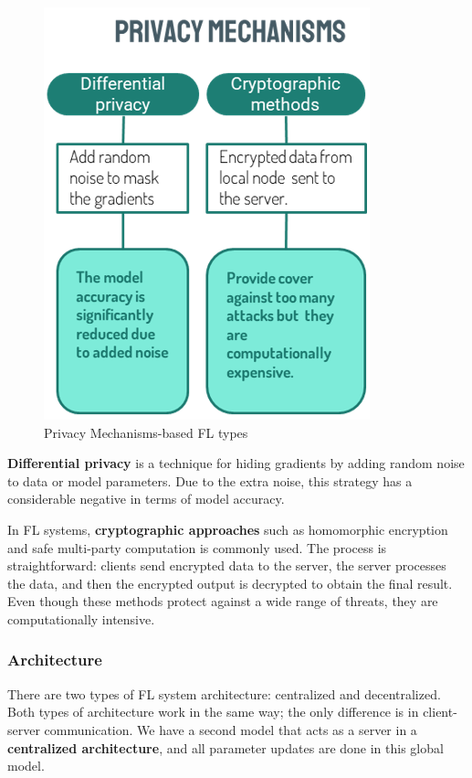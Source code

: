 \begin{figure}[H]
\centering
\includegraphics[scale=0.5]{img/fl_privacy_methods.png}
\caption{Privacy Mechanisms-based FL types}
\label{fig:fl_privacy_methods}
\end{figure}

\textbf{Differential privacy} is a technique for hiding gradients by adding random noise to data or model parameters. Due to the extra noise, this strategy has a considerable negative in terms of model accuracy.

In FL systems, \textbf{cryptographic approaches} such as homomorphic encryption and safe multi-party computation is commonly used. The process is straightforward: clients send encrypted data to the server, the server processes the data, and then the encrypted output is decrypted to obtain the final result. Even though these methods protect against a wide range of threats, they are computationally intensive.

\subsubsection{Architecture}

There are two types of FL system architecture: centralized and decentralized. Both types of architecture work in the same way; the only difference is in client-server communication. We have a second model that acts as a server in a \textbf{centralized architecture}, and all parameter updates are done in this global model. 


